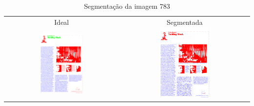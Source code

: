 \documentclass[a4paper,11pt]{article}
\begin{document}
    \begin{table}[p]
      \caption{Segmentação da imagem 783}
      \begin{center}
        \begin{tabular}{ c c }
          Ideal & Segmentada \\
          \includegraphics[width=0.4\textwidth]{assets/final_ideal/time_783_ideal.png}
          &
          \includegraphics[width=0.4\textwidth]{assets/result_imagens/time_50_percent_sparse_9x9_783_final.png}
        \end{tabular}
      \end{center}
      \label{tab:segmentation_783}
    \end{table}
\end{document}
